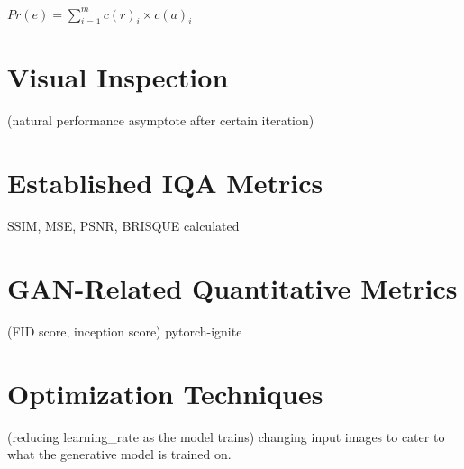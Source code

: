 

\begin{center}
$Pr(e) = \displaystyle\sum_{i=1}^{m} c(r)_i \times c(a)_i $
\end{center}


\section{Visual Inspection}

(natural performance asymptote after certain iteration)

\section{Established IQA Metrics}

SSIM, MSE, PSNR, BRISQUE calculated


\section{GAN-Related Quantitative Metrics}


(FID score, inception score)
pytorch-ignite

\section{Optimization Techniques}

(reducing learning\_rate as the model trains)
changing input images to cater to what the generative model is trained on.